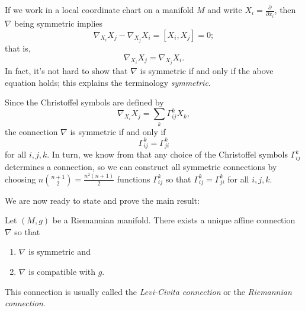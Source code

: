 \begin{example}
	If we work in a local coordinate chart on a manifold $M$ and write $X_i = \frac{\partial}{\partial x_i}$, then $\nabla$ being symmetric implies
	\[
		\nabla_{X_i} X_j - \nabla_{X_j}X_i = [X_i,X_j] = 0;
	\]
	that is,
	\[
		\nabla_{X_i}X_j = \nabla_{X_j}X_i.
	\]
	In fact, it's not hard to show that $\nabla$ is symmetric if and only if the above equation holds; this explains the terminology \emph{symmetric}.
	
	Since the Christoffel symbols are defined by
	\[
		\nabla_{X_i}X_j = \sum_k \Gamma_{ij}^k X_k,
	\]
	the connection $\nabla$ is symmetric if and only if
	\[
		\Gamma_{ij}^k = \Gamma_{ji}^k
	\]
	for all $i,j,k$. In turn, we know from  that any choice of the Christoffel symbols $\Gamma_{ij}^k$ determines a connection, so we can construct all symmetric connections by choosing $n \binom{n+1}{2} = \frac{n^2(n+1)}{2}$ functions $\Gamma_{ij}^k$ so that $\Gamma_{ij}^k = \Gamma_{ji}^k$ for all $i,j,k$.
\end{example}

We are now ready to state and prove the main result:

\begin{theorem}\label{thm:levi-civita}
	Let $(M,g)$ be a Riemannian manifold. There exists a unique affine connection $\nabla$ so that
	\begin{enumerate}
		\item $\nabla$ is symmetric and
		\item $\nabla$ is compatible with $g$.
	\end{enumerate}
\end{theorem}

This connection is usually called the \emph{Levi-Civita connection} or the \emph{Riemannian connection}.

